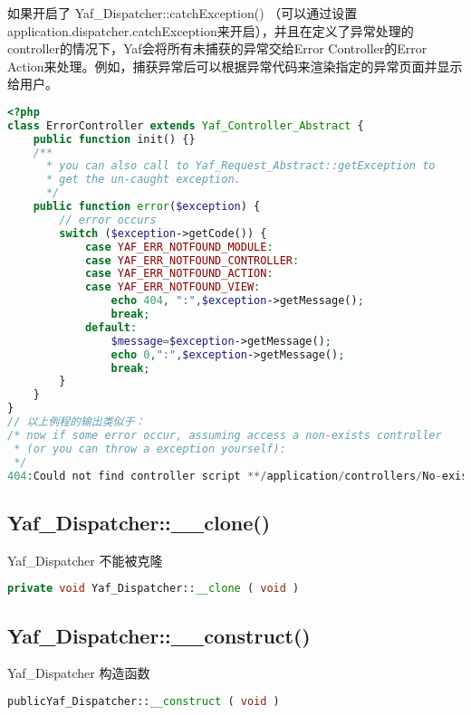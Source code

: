 如果开启了 Yaf\_Dispatcher::catchException() （可以通过设置application.dispatcher.catchException来开启），并且在定义了异常处理的controller的情况下，Yaf会将所有未捕获的异常交给Error Controller的Error Action来处理。例如，捕获异常后可以根据异常代码来渲染指定的异常页面并显示给用户。

\begin{lstlisting}[language=PHP]
<?php
class ErrorController extends Yaf_Controller_Abstract {
    public function init() {}
    /** 
      * you can also call to Yaf_Request_Abstract::getException to  
      * get the un-caught exception.
      */
    public function error($exception) {
        // error occurs
        switch ($exception->getCode()) {
            case YAF_ERR_NOTFOUND_MODULE:
            case YAF_ERR_NOTFOUND_CONTROLLER:
            case YAF_ERR_NOTFOUND_ACTION:
            case YAF_ERR_NOTFOUND_VIEW:
                echo 404, ":",$exception->getMessage();
                break;
            default:
                $message=$exception->getMessage();
                echo 0,":",$exception->getMessage();
                break;
        }
    }
}
// 以上例程的输出类似于：
/* now if some error occur, assuming access a non-exists controller
 * (or you can throw a exception yourself): 
 */
404:Could not find controller script **/application/controllers/No-exists-controller.php
\end{lstlisting}



\subsection{Yaf\_Dispatcher::\_\_clone()}

 Yaf\_Dispatcher 不能被克隆


\begin{lstlisting}[language=PHP]
private void Yaf_Dispatcher::__clone ( void )
\end{lstlisting}




\subsection{Yaf\_Dispatcher::\_\_construct()}

Yaf\_Dispatcher 构造函数

\begin{lstlisting}[language=PHP]
publicYaf_Dispatcher::__construct ( void )
\end{lstlisting}



